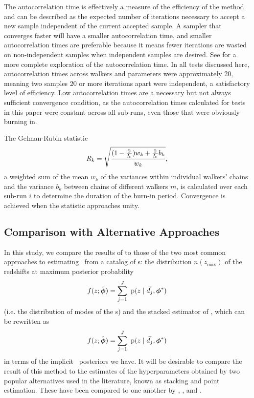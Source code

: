 The autocorrelation time is effectively a measure of the efficiency of the method and can be described as the expected number of iterations necessary to accept a new sample independent of the current accepted sample.  
A sampler that converges faster will have a smaller autocorrelation time, and smaller autocorrelation times are preferable because it means fewer iterations are wasted on non-independent samples when independent samples are desired.  
See \citet{Foreman-Mackey2013} for a more complete exploration of the autocorrelation time.  
In all tests discussed here, autocorrelation times across walkers and parameters were approximately 20, meaning two samples 20 or more iterations apart were independent, a satisfactory level of efficiency.  
Low autocorrelation times are a necessary but not always sufficient convergence condition, as the autocorrelation times calculated for tests in this paper were constant across all sub-runs, even those that were obviously burning in.  

The Gelman-Rubin statistic
\begin{equation}
\eqlabel{eq:gr}
R_{k} = \sqrt{\frac{(1 - \frac{2}{I_{0}}) w_{k} + \frac{2}{I_{0}} b_{k}}{w_{k}}},
\end{equation}
a weighted sum of the mean $w_{k}$ of the variances within individual walkers' chains and the variance $b_{k}$ between chains of different walkers $m$, is calculated over each sub-run $i$ to determine the duration of the burn-in period.  
Convergence is achieved when the statistic approaches unity.  

\subsection{Comparison with Alternative Approaches}

In this study, we compare the results of  to those of the two most common approaches to estimating \nz\ from a catalog of \pzpdf s: the distribution $n(z_{\mathrm{max}})$ of the redshifts at maximum posterior probability
\begin{equation}
\eqlabel{eq:mmap}
f(z; \hat{\ndphi}) = \sum_{j=1}^{J}\ \pr{z \gvn \data_{j}, \ndphi^{*}}
\end{equation}
(i.e. the distribution of modes of the \pzpdf s) and the stacked estimator of , which can be rewritten as 
\begin{equation}
\eqlabel{eq:stack}
f(z; \hat{\ndphi}) = \sum_{j=1}^{J}\ \pr{z \gvn \data_{j}, \ndphi^{*}}
\end{equation}
in terms of the implicit \pz\ posteriors we have.
It will be desirable to compare the result of this method to the estimates of the hyperparameters obtained by two popular alternatives used in the literature, known as stacking and point estimation.   
These have been compared to one another by \citet{Hildebrandt2012}, \citet{Benjamin2013}, and \citet{Asorey2016}.

